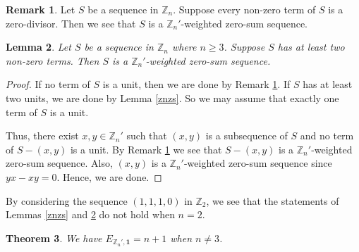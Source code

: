\documentclass{article}[11pt]
\newtheorem{theorem}{Theorem}[section]
\newtheorem{lemma}[theorem]{Lemma}
\theoremstyle{definition}
\newtheorem{remark}[theorem]{Remark}
\begin{document}
\begin{remark}\label{znzd}
Let $S$ be a sequence in $\mathbb Z_n$. Suppose every non-zero term of $S$ is a zero-divisor. Then we see that $S$ is a $\mathbb Z_n'$-weighted zero-sum sequence.
\end{remark}

\begin{lemma}\label{z'}
Let $S$ be a sequence in $\mathbb Z_n$ where $n\geq 3$. Suppose $S$ has at least two non-zero terms. Then $S$ is a $\mathbb Z_n'$-weighted zero-sum sequence.
\end{lemma}

\begin{proof}
If no term of $S$ is a unit, then we are done by Remark \ref{znzd}. If $S$ has at least two units, we are done by Lemma \ref{znzs}. So we may assume that exactly one term of $S$ is a unit.

Thus, there exist $x,y\in \mathbb Z_n'$ such that $(x,y)$ is a subsequence of $S$ and no term of $S-(x,y)$ is a unit. By Remark \ref{znzd} we see that $S-(x,y)$ is a $\mathbb Z_n'$-weighted zero-sum sequence. Also, $(x,y)$ is a $\mathbb Z_n'$-weighted zero-sum sequence since $yx-xy=0$. Hence, we are done.
\end{proof}

By considering the sequence $(1,1,1,0)$ in $\mathbb Z_2$, we see that the statements of Lemmas \ref{znzs} and \ref{z'} do not hold when $n=2$.

\begin{theorem}\label{enz}
We have $E_{\mathbb Z_n',\mathbf 1}=n+1$ when $n\neq 3$.
\end{theorem}
\end{document}
